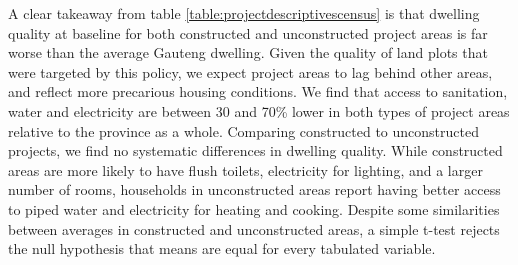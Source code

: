 \documentclass[12pt]{article}
\begin{document}
A clear takeaway from table \ref{table:projectdescriptivescensus} is that dwelling quality at baseline for both constructed and unconstructed project areas is far worse than the average Gauteng dwel\-ling. Given the quality of land plots that were targeted by this policy, we expect project areas to lag behind other areas, and reflect more precarious housing conditions. We find that access to sanitation, water and electricity are between 30 and 70\% lower in both types of project areas relative to the province as a whole. Comparing constructed to unconstructed projects, we find no systematic differences in dwelling quality. While constructed areas are more likely to have flush toilets, electricity for lighting, and a larger number of rooms, households in unconstructed areas report having better access to piped water and electricity for heating and cooking. Despite some similarities between averages in constructed and unconstructed areas, a simple t-test rejects the null hypothesis that means are equal for every tabulated variable.
\end{document}
